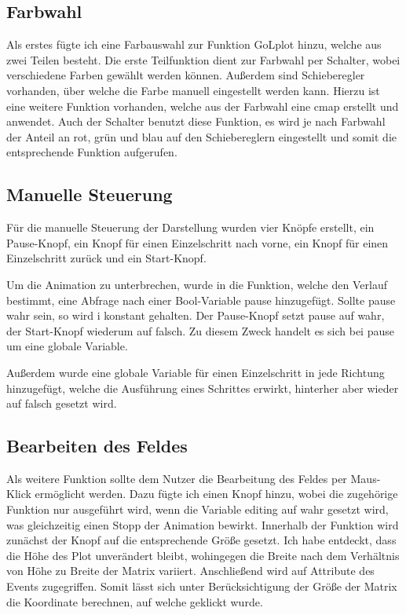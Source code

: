 \documentclass{scrartcl}
\begin{document}
\subsection{Farbwahl}
Als erstes fügte ich eine Farbauswahl zur Funktion GoLplot hinzu, welche aus zwei Teilen besteht. Die erste Teilfunktion dient zur Farbwahl per Schalter, wobei verschiedene Farben gewählt werden können. Außerdem sind Schieberegler vorhanden, über welche die Farbe manuell eingestellt werden kann. Hierzu ist eine weitere Funktion vorhanden, welche aus der Farbwahl eine cmap erstellt und anwendet. Auch der Schalter benutzt diese Funktion, es wird je nach Farbwahl der Anteil an rot, grün und blau auf den Schiebereglern eingestellt und somit die entsprechende Funktion aufgerufen.

\subsection{Manuelle Steuerung}
Für die manuelle Steuerung der Darstellung wurden vier Knöpfe erstellt, ein Pause-Knopf, ein Knopf für einen Einzelschritt nach vorne, ein Knopf für einen Einzelschritt zurück und ein Start-Knopf.

Um die Animation zu unterbrechen, wurde in die Funktion, welche den Verlauf bestimmt, eine Abfrage nach einer Bool-Variable pause hinzugefügt. Sollte pause wahr sein, so wird i konstant gehalten. Der Pause-Knopf setzt pause auf wahr, der Start-Knopf wiederum auf falsch. Zu diesem Zweck handelt es sich bei pause um eine globale Variable.

Außerdem wurde eine globale Variable für einen Einzelschritt in jede Richtung hinzugefügt, welche die Ausführung eines Schrittes erwirkt, hinterher aber wieder auf falsch gesetzt wird.

\subsection{Bearbeiten des Feldes}
Als weitere Funktion sollte dem Nutzer die Bearbeitung des Feldes per Maus-Klick ermöglicht werden. Dazu fügte ich einen Knopf hinzu, wobei die zugehörige Funktion nur ausgeführt wird, wenn die Variable editing auf wahr gesetzt wird, was gleichzeitig einen Stopp der Animation bewirkt.
Innerhalb der Funktion wird zunächst der Knopf auf die entsprechende Größe gesetzt. Ich habe entdeckt, dass die Höhe des Plot unverändert bleibt, wohingegen die Breite nach dem Verhältnis von Höhe zu Breite der Matrix variiert. Anschließend wird auf Attribute des Events zugegriffen. Somit lässt sich unter Berücksichtigung der Größe der Matrix die Koordinate berechnen, auf welche geklickt wurde.
\end{document}

